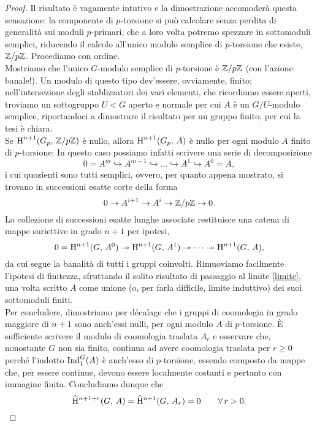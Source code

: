 \begin{proof}
	Il risultato è vagamente intutivo e la dimostrazione accomoderà questa sensazione: la componente di $ p $-torsione si può calcolare senza perdita di generalità sui moduli $ p $-primari, che a loro volta potremo spezzare in sottomoduli semplici, riducendo il calcolo all'unico modulo semplice di $ p $-torsione che esiste, $ \mathbb{Z}/p\mathbb{Z} $. Procediamo con ordine. \\
	
	Mostriamo che l'unico $ G $-modulo semplice di $ p $-torsione è $ \mathbb{Z}/p\mathbb{Z} $ (con l'azione banale!). Un modulo di questo tipo dev'essere, ovviamente, finito; nell'intersezione degli stablizzatori dei vari elementi, che ricordiamo essere aperti, troviamo un sottogruppo $ U < G $ aperto e normale per cui $ A $ è un $ G/U $-modulo semplice, riportandoci a dimostrare il risultato per un gruppo finito, per cui la tesi è chiara. \\
	
	Se $ \operatorname{H}^{n+1}(G_p, \, \mathbb{Z}/p\mathbb{Z}) $ è nullo, allora $ \operatorname{H}^{n+1}(G_p, \, A) $ è nullo per ogni modulo $ A $ finito di $ p $-torsione: In questo caso possiamo infatti scrivere una serie di decomposizione
	\[ 0 = A^m \hookrightarrow A^{m-1} \hookrightarrow \dots \hookrightarrow A^1 \hookrightarrow A^0 = A, \]
	i cui quozienti sono tutti semplici, ovvero, per quanto appena mostrato, si trovano in successioni esatte corte della forma
	\[ 0 \to A^{i+1} \to A^i \to \mathbb{Z}/p\mathbb{Z} \to 0. \]
	La collezione di successioni esatte lunghe associate restituisce una catena di mappe suriettive in grado $ n+1 $ per ipotesi,
	\[ 0 = \operatorname{H}^{n+1}(G, \, A^0) \twoheadrightarrow \operatorname{H}^{n+1}(G, \, A^1) \twoheadrightarrow \dots \twoheadrightarrow \operatorname{H}^{n+1}(G, \, A), \]
	da cui segue la banalità di tutti i gruppi coinvolti. Rimuoviamo facilmente l'ipotesi di finitezza, sfruttando il solito risultato di passaggio al limite \ref{limite}, una volta scritto $ A $ come unione (o, per farla difficile, limite induttivo) dei suoi sottomoduli finiti. \\
	
	Per concludere, dimostriamo per décalage che i gruppi di coomologia in grado maggiore di $ n+1 $ sono anch'essi nulli, per ogni modulo $ A $ di $ p $-torsione. È sufficiente scrivere il modulo di coomologia traslata $ A_{r} $ e osservare che, nonostante $ G $ non sia finito, continua ad avere coomologia traslata per $ r \geq 0 $ perché l'indotto $ \operatorname{Ind}_1^G(A) $ è anch'esso di $ p $-torsione, essendo composto da mappe che, per essere continue, devono essere localmente costanti e pertanto con immagine finita. Concludiamo dunque che	
	\begin{equation*}
	 \operatorname{\widehat{H}^{\mathnormal{n}+1+\mathnormal{r}}}(G, \, A) = \operatorname{\widehat{H}^{\mathnormal{n}+1}}(G, \, A_r) = 0 \qquad \forall\, r > 0. \qedhere
	\end{equation*}
\end{proof}

